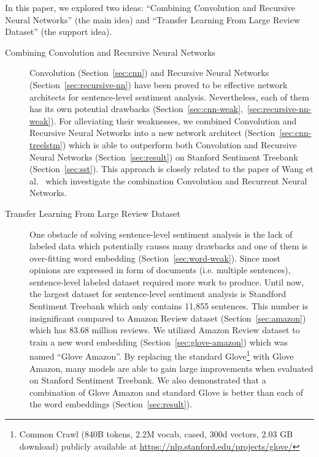 In this paper, we explored two ideas: ``Combining Convolution and Recursive Neural Networks'' (the main idea) and ``Transfer Learning From Large Review Dataset'' (the support idea).
\begin{description}
	\item[Combining Convolution and Recursive Neural Networks] Convolution (Section~\ref{sec:cnn}) and Recursive Neural Networks (Section~\ref{sec:recursive-nn}) have been proved to be effective network architects for sentence-level sentiment analysis.
	Nevertheless, each of them has its own potential drawbacks (Section~\ref{sec:cnn-weak},~\ref{sec:recursive-nn-weak}).
	For alleviating their weaknesses, we combined Convolution and Recursive Neural Networks into a new network architect (Section~\ref{sec:cnn-treelstm}) which is able to outperform both Convolution and Recursive Neural Networks (Section~\ref{sec:result}) on Stanford Sentiment Treebank (Section~\ref{sec:sst}).
	This approach is closely related to the paper of Wang et al.~\cite{cnn-rnn} which investigate the combination Convolution and Recurrent Neural Networks.
	\item[Transfer Learning From Large Review Dataset] One obstacle of solving sentence-level sentiment analysis is the lack of labeled data which potentially causes many drawbacks and one of them is over-fitting word embedding (Section~\ref{sec:word-weak}).
	Since most opinions are expressed in form of  documents (i.e. multiple sentences), sentence-level labeled dataset required more work to produce.
	Until now, the largest dataset for sentence-level sentiment analysis is Standford Sentiment Treebank which only contains 11,855 sentences.
	This number is insignificant compared to Amazon Review dataset (Section~\ref{sec:amazon}) which has 83.68 million reviews.
	We utilized Amazon Review dataset to train a new word embedding (Section~\ref{sec:glove-amazon}) which was named ``Glove Amazon''.
	By replacing the standard Glove\footnote{Common Crawl (840B tokens, 2.2M vocab, cased, 300d vectors, 2.03 GB download) publicly available at \url{https://nlp.stanford.edu/projects/glove/}} with Glove Amazon, many models are able to gain large improvements when evaluated on Stanford Sentiment Treebank.
	We also demonstrated that a combination of Glove Amazon and standard Glove is better than each of the word embeddings (Section~\ref{sec:result}).
\end{description}

